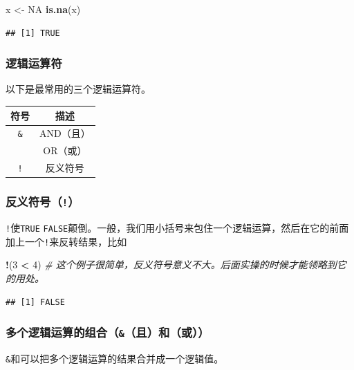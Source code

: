\documentclass[]{book}
\newenvironment{Shaded}{\begin{snugshade}}{\end{snugshade}}
\newcommand{\CommentTok}[1]{\textcolor[rgb]{0.56,0.35,0.01}{\textit{#1}}}
\newcommand{\DecValTok}[1]{\textcolor[rgb]{0.00,0.00,0.81}{#1}}
\newcommand{\KeywordTok}[1]{\textcolor[rgb]{0.13,0.29,0.53}{\textbf{#1}}}
\newcommand{\NormalTok}[1]{#1}
\newcommand{\OperatorTok}[1]{\textcolor[rgb]{0.81,0.36,0.00}{\textbf{#1}}}
\newcommand{\OtherTok}[1]{\textcolor[rgb]{0.56,0.35,0.01}{#1}}
\newcommand{\StringTok}[1]{\textcolor[rgb]{0.31,0.60,0.02}{#1}}
\begin{document}
\begin{Shaded}
\begin{Highlighting}[]
\NormalTok{x <-}\StringTok{ }\OtherTok{NA}
\KeywordTok{is.na}\NormalTok{(x)}
\end{Highlighting}
\end{Shaded}

\begin{verbatim}
## [1] TRUE
\end{verbatim}

\subsubsection{逻辑运算符}

以下是最常用的三个逻辑运算符。

\begin{longtable}[]{@{}cc@{}}
\toprule
符号 & 描述\tabularnewline
\midrule
\endhead
\texttt{\&} & AND（且）\tabularnewline
\texttt{\textbar{}} & OR（或）\tabularnewline
\texttt{!} & 反义符号\tabularnewline
\bottomrule
\end{longtable}

\subsubsection{\texorpdfstring{反义符号（\texttt{!}）}{反义符号（!）}}

\texttt{!}使\texttt{TRUE} \texttt{FALSE}颠倒。一般，我们用小括号来包住一个逻辑运算，然后在它的前面加上一个\texttt{!}来反转结果，比如

\begin{Shaded}
\begin{Highlighting}[]
\OperatorTok{!}\NormalTok{(}\DecValTok{3} \OperatorTok{<}\StringTok{ }\DecValTok{4}\NormalTok{) }\CommentTok{# 这个例子很简单，反义符号意义不大。后面实操的时候才能领略到它的用处。}
\end{Highlighting}
\end{Shaded}

\begin{verbatim}
## [1] FALSE
\end{verbatim}

\subsubsection{\texorpdfstring{多个逻辑运算的组合（\texttt{\&}（且）和\texttt{\textbar{}}（或））}{多个逻辑运算的组合（\&（且）和\textbar{}（或））}}

\texttt{\&}和\texttt{\textbar{}}可以把多个逻辑运算的结果合并成一个逻辑值。
\end{document}
